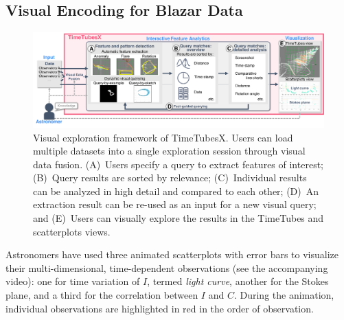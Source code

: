 \subsection{Visual Encoding for Blazar Data}\label{sec:VisualEncoding}
\begin{figure}
    \centering
    \includegraphics[width=.99\linewidth]{vgtc_journal_latex/figures/workflowGray.pdf}
    \caption{Visual exploration framework of TimeTubesX. Users can load multiple datasets into a single exploration session through visual data fusion. (A)~Users specify a query to extract features of interest; (B)~Query results are sorted by relevance; (C)~Individual results can be analyzed in high detail and compared to each other; (D)~An extraction result can be re-used as an input for a new visual query; and (E)~Users can visually explore the results in the TimeTubes and scatterplots views.}
    \label{fig:framework}
\end{figure}
Astronomers have used three animated scatterplots with error bars to visualize their multi-dimensional, time-dependent observations (see the accompanying video): one for time variation of $I$, termed \textit{light curve}, another for the Stokes plane, and a third for the correlation between $I$ and $C$.
During the animation, individual observations are highlighted in red in the order of observation.
%

